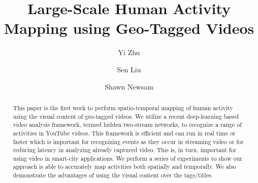 \documentclass[sigconf]{acmart}
\begin{document}
	\title{Large-Scale Human Activity Mapping using Geo-Tagged Videos}
	
	\author{Yi Zhu}
	
	\author{Sen Liu}
	
	\author{Shawn Newsam}
	
	\renewcommand{\shortauthors}{Yi Zhu, Sen Liu and Shawn Newsam}
	
	
	\begin{abstract}
		This paper is the first work to perform spatio-temporal mapping of human activity using the visual content of geo-tagged videos. We utilize a recent deep-learning based video analysis framework, termed hidden two-stream networks, to recognize a range of activities in YouTube videos. This framework is efficient and can run in real time or faster which is important for recognizing events as they occur in streaming video or for reducing latency in analyzing already captured video. This is, in turn, important for using video in smart-city applications. We perform a series of experiments to show our approach is able to accurately map activities both spatially and temporally. We also demonstrate the advantages of using the visual content over the tags/titles.
	\end{abstract}
	
	
\end{document}

